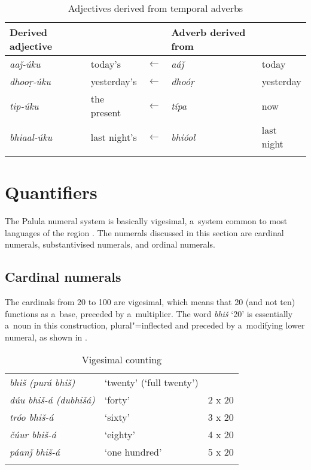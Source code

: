 \begin{table}[ht]
\caption{Adjectives derived from temporal adverbs}

\begin{tabularx}{\textwidth}{ Q l l Q l }
\lsptoprule
Derived adjective &
&
&
Adverb derived from &
\\\hline
\textit{aaǰ-úku} &
today's &
$\leftarrow$ &
\textit{aáǰ} &
today\\
\textit{dhooṛ-úku} &
yesterday's &
$\leftarrow$ &
\textit{dhoóṛ} &
yesterday\\
\textit{tip-úku} &
the present &
$\leftarrow$ &
\textit{típa} &
now\\
\textit{bhiaal-úku} &
last night's &
$\leftarrow$ &
\textit{bhióol} &
last night\\\lspbottomrule
\end{tabularx}
\label{tab:6-6}
\end{table}


\section{Quantifiers}
\label{sec:6-4}

The Palula numeral system is basically vigesimal, a~system common to most languages of the region \citep[823]{bashir2003}. The numerals discussed in this section are cardinal numerals, substantivised numerals, and ordinal numerals.


\subsection{Cardinal numerals}
\label{subsec:6-4-1}

The cardinals from 20 to 100 are vigesimal, which means that 20 (and not ten) functions as a~base, preceded by a~multiplier. The word \textit{bhiš} `20' is essentially a~noun in this construction, plural"=inflected and preceded by a~modifying lower numeral, as shown in . 


\begin{table}
\caption{Vigesimal counting}
\begin{tabularx}{\textwidth}{ Q Q l@{\hspace{50pt}} }
\lsptoprule
\textit{bhiš (purá bhiš)} &
`twenty' (`full twenty') &
\\
\textit{dúu bhiš-á (dubhišá)} &
`forty' &
2 x 20\\
\textit{tróo bhiš-á} &
`sixty' &
3 x 20\\
\textit{čúur bhiš-á} &
`eighty' &
4 x 20\\
\textit{páanǰ bhiš-á} &
`one hundred' &
5 x 20\\\lspbottomrule
\end{tabularx}
\label{tab:6-vig}
\end{table}


